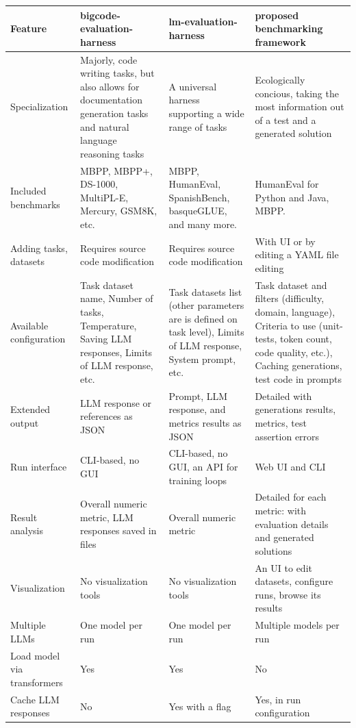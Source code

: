 \begin{landscape}
\begin{longtable}{|p{4cm}|p{5cm}|p{5cm}|p{5cm}|}


       \hline
       \textbf{Feature} & \textbf{bigcode-evaluation-harness} & \textbf{lm-evaluation-harness} & \textbf{proposed benchmarking framework} \\
        \hline
        Specialization & Majorly, code writing tasks, but also allows for documentation generation tasks and natural language reasoning tasks & A universal harness supporting a wide range of tasks & Ecologically concious, taking the most information out of a test and a generated solution \\
        \hline
        Included benchmarks & MBPP, MBPP+, DS-1000, MultiPL-E, Mercury, GSM8K, etc. & MBPP, HumanEval, SpanishBench, basqueGLUE, and many more. & HumanEval for Python and Java, MBPP. \\
        \hline
        Adding tasks, datasets & Requires source code modification & Requires source code modification & With UI or by editing a YAML file editing \\
        \hline
        Available configuration & Task dataset name, Number of tasks, Temperature, Saving LLM responses, Limits of LLM response, etc. & Task datasets list (other parameters are is defined on task level), Limits of LLM response, System prompt, etc. & Task dataset and filters (difficulty, domain, language), Criteria to use (unit-tests, token count, code quality, etc.), Caching generations, test code in prompts \\
        \hline
        Extended output & LLM response or references as JSON & Prompt, LLM response, and metrics results as JSON & Detailed with generations results, metrics, test assertion errors  \\
        \hline
        Run interface & CLI-based, no GUI & CLI-based, no GUI, an API for training loops & Web UI and CLI \\
        \hline
        Result analysis & Overall numeric metric, LLM responses saved in files & Overall numeric metric & Detailed for each metric: with evaluation details and generated solutions  \\
        \hline
        Visualization & No visualization tools & No visualization tools & An UI to edit datasets, configure runs, browse its results \\
        \hline
        Multiple LLMs & One model per run & One model per run & Multiple models per run\\
        \hline
        Load model via transformers & Yes & Yes & No \\
        \hline
        Cache LLM responses & No & Yes with a flag & Yes, in run configuration \\
        \hline


\end{longtable}
\end{landscape}
